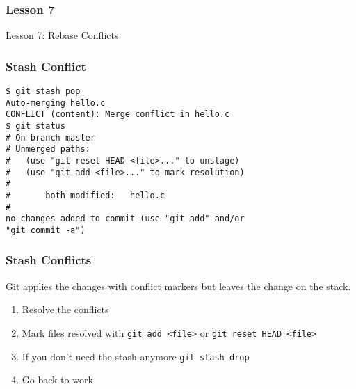 \begin{frame}
    \frametitle{Lesson 7}
    \alert{Lesson 7}: Rebase Conflicts
\end{frame}

\begin{frame}[fragile]
    \frametitle{Stash Conflict}
    \small
    \begin{verbatim}
$ git stash pop
Auto-merging hello.c
CONFLICT (content): Merge conflict in hello.c
$ git status
# On branch master
# Unmerged paths:
#   (use "git reset HEAD <file>..." to unstage)
#   (use "git add <file>..." to mark resolution)
#
#       both modified:   hello.c
#
no changes added to commit (use "git add" and/or
"git commit -a")
    \end{verbatim}
\end{frame}

\begin{frame}
    \frametitle{Stash Conflicts}
    Git applies the changes with conflict markers but leaves the change on the
    stack.
    \medskip
    \begin{enumerate}[1.]
        \item Resolve the conflicts
        \item Mark files resolved with \texttt{git add <file>} or
              \texttt{git reset HEAD <file>}
        \item If you don't need the stash anymore \texttt{git stash drop}
        \item Go back to work
    \end{enumerate}
\end{frame}
